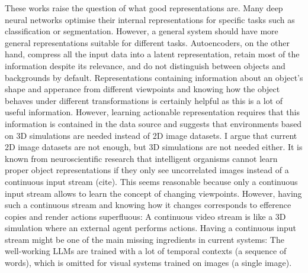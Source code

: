 These works raise the question of what good representations are. Many deep neural networks optimise their internal representations for specific tasks such as classification or segmentation. However, a general system should have more general representations suitable for different tasks. Autoencoders, on the other hand, compress all the input data into a latent representation, retain most of the information despite its relevance, and do not distinguish between objects and backgrounds by default. Representations containing information about an object's shape and apperance from different viewpoints and knowing how the object behaves under different transformations is certainly helpful as this is a lot of useful information. However, learning actionable representation requires that this information is contained in the data source and suggests that environments based on 3D simulations are needed instead of 2D image datasets. I argue that current 2D image datasets are not enough, but 3D simulations are not needed either. It is known from neuroscientific research that intelligent organisms cannot learn proper object representations if they only see uncorrelated images instead of a continuous input stream (cite). This seems reasonable because only a continuous input stream allows to learn the concept of changing viewpoints. However, having such a continuous stream and knowing how it changes corresponds to efference copies and render actions superfluous: A continuous video stream is like a 3D simulation where an external agent performs actions. Having a continuous input stream might be one of the main missing ingredients in current systems: The well-working LLMs are trained with a lot of temporal contexts (a sequence of words), which is omitted for visual systems trained on images (a single image). 

